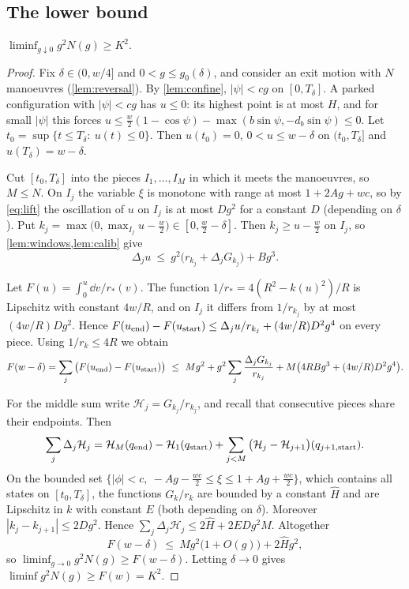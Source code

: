 \subsection{The lower bound}

\begin{proposition}\label{prop:asym-lower}
$\liminf_{g\downarrow0}g^2N(g)\ge K^2$.
\end{proposition}

\begin{proof}
Fix $\delta\in(0,w/4]$ and $0<g\le g_0(\delta)$, and consider an exit motion with $N$ manoeuvres (\cref{lem:reversal}).
By \cref{lem:confine}, $|\psi|<cg$ on $[0,T_\delta]$.
A parked configuration with $|\psi|<cg$ has $u\le0$: its highest point is at most $H$, and for small $|\psi|$ this forces $u\le\frac w2(1-\cos\psi)-\max(b\sin\psi,-d_b\sin\psi)\le0$.
Let $t_0=\sup\{t\le T_\delta:\ u(t)\le0\}$.
Then $u(t_0)=0$, $0<u\le w-\delta$ on $(t_0,T_\delta]$ and $u(T_\delta)=w-\delta$.

Cut $[t_0,T_\delta]$ into the pieces $I_1,\dots,I_M$ in which it meets the manoeuvres, so $M\le N$.
On $I_j$ the variable $\xi$ is monotone with range at most $1+2Ag+wc$, so by \eqref{eq:lift} the oscillation of $u$ on $I_j$ is at most $Dg^2$ for a constant $D$ (depending on $\delta$).
Put $k_j=\max\big(0,\max_{I_j}u-\tfrac w2\big)\in[0,\tfrac w2-\delta]$.
Then $k_j\ge u-\frac w2$ on $I_j$, so \cref{lem:windows,lem:calib} give
\[
  \Delta_ju\ \le\ g^2\big(r_{k_j}+\Delta_jG_{k_j}\big)+Bg^3 .
\]

Let $F(u)=\int_0^u\dd v/r_*(v)$.
The function $1/r_*=4(R^2-k(u)^2)/R$ is Lipschitz with constant $4w/R$, and on $I_j$ it differs from $1/r_{k_j}$ by at most $(4w/R)Dg^2$.
Hence $F(u_{\rm end})-F(u_{\rm start})\le\Delta_ju/r_{k_j}+(4w/R)D^2g^4$ on every piece.
Using $1/r_{k}\le4R$ we obtain
\[
  F(w-\delta)=\sum_j\big(F(u_{\rm end})-F(u_{\rm start})\big)\ \le\ Mg^2+g^2\sum_j\frac{\Delta_jG_{k_j}}{r_{k_j}}+M\big(4RBg^3+(4w/R)D^2g^4\big).
\]

For the middle sum write $\mathcal H_j=G_{k_j}/r_{k_j}$, and recall that consecutive pieces share their endpoints.
Then
\[
  \sum_j\Delta_j\mathcal H_j=\mathcal H_M(q_{\rm end})-\mathcal H_1(q_{\rm start})+\sum_{j<M}\big(\mathcal H_j-\mathcal H_{j+1}\big)(q_{j+1,\rm start}).
\]
On the bounded set $\{|\phi|<c,\ -Ag-\frac{wc}2\le\xi\le1+Ag+\frac{wc}2\}$, which contains all states on $[t_0,T_\delta]$, the functions $G_k/r_k$ are bounded by a constant $\hat H$ and are Lipschitz in $k$ with constant $E$ (both depending on $\delta$).
Moreover $|k_j-k_{j+1}|\le2Dg^2$.
Hence $\sum_j\Delta_j\mathcal H_j\le2\hat H+2EDg^2M$.
Altogether
\[
  F(w-\delta)\ \le\ Mg^2\big(1+O(g)\big)+2\hat Hg^2,
\]
so $\liminf_{g\to0}g^2N(g)\ge F(w-\delta)$.
Letting $\delta\to0$ gives $\liminf g^2N(g)\ge F(w)=K^2$.
\end{proof}

